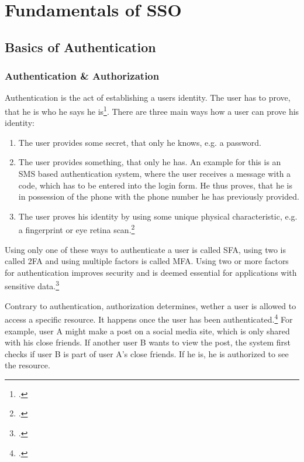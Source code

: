 \section{Fundamentals of \ac{SSO}}

\subsection{Basics of Authentication}
\subsubsection{Authentication \& Authorization}

Authentication is the act of establishing a users identity. The user has to prove, that he is who he says
he is\footcite[Cp.][p. 398]{Basavala2012}.
There are three main ways how a user can prove his identity:
\begin{enumerate}
    \item The user provides some secret, that only he knows, e.g. a password.
    \item The user provides something, that only he has.
          An example for this is an \ac{SMS} based authentication system, where the user receives a message with a code,
          which has to be entered into the login form. He thus proves, that he is in possession of the phone with the phone
          number he has previously provided.
    \item The user proves his identity by using some unique physical characteristic, e.g. a fingerprint or eye retina scan.\footcite[Cp.][p. 398]{Basavala2012}
\end{enumerate}
Using only one of these ways to authenticate a user is called \ac{SFA}, using two is called \ac{2FA} and using 
multiple factors is called \ac{MFA}.
Using two or more factors for authentication improves security and is deemed essential for applications with sensitive data.\footcite[Cp.][]{Drew2019}

Contrary to authentication, authorization determines, wether a user is allowed to access a specific resource.
It happens once the user has been authenticated.\footcite[Cp.][]{Auth0AuthNvsAuthZ} For example, user A might make a post on a social media site,
which is only shared with his close friends. If another user B wants to view the post, the system first checks
if user B is part of user A's close friends. If he is, he is authorized to see the resource.

